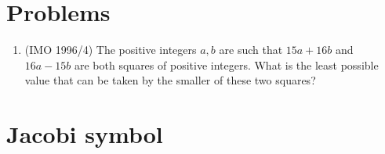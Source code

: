 \section*{Problems}
\begin{enumerate}
\item (IMO 1996/4) The positive integers $a,b$ are such that $15a+16b$ and $16a-15b$ are both squares of positive integers. What is the least possible value that can be taken by the smaller of these two squares?
\end{enumerate}
\section{Jacobi symbol}
%
%
